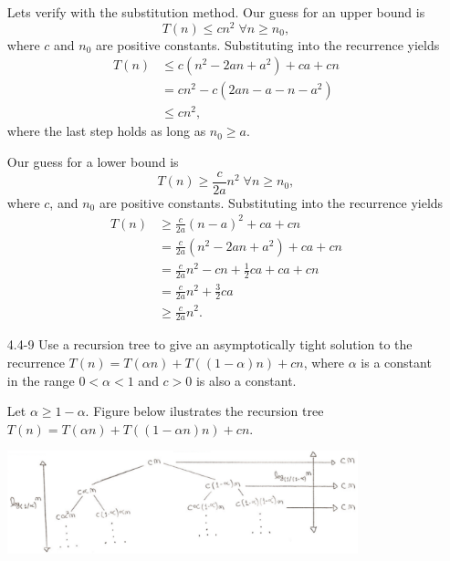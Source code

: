 \documentclass{report}
\makeatletter
\renewenvironment{framed}{%
 \def\FrameCommand##1{\hskip\@totalleftmargin
 \fboxsep=\FrameSep\fbox{##1}}%
 \MakeFramed {\advance\hsize-\width
   \@totalleftmargin\z@ \linewidth\hsize
   \@setminipage}}%
 {\par\unskip\endMakeFramed}
\DeclareMathOperator{\Forall}{\forall}
\makeatother
\begin{document}
\begin{enumerate}
\begin{framed}
Lets verify with the substitution method. Our guess for an upper bound is
\[
T(n) \le cn^2 \; \Forall n \ge n_0,
\]
where $c$ and $n_0$ are positive constants. Substituting into the
recurrence yields
\begin{equation*}
\begin{aligned}
  T(n) &\le c (n^2 - 2an + a^2) + ca + cn\\
       &=   cn^2 - c (2an - a - n - a^2)\\
       &\le cn^2,
\end{aligned}
\end{equation*}
where the last step holds as long as $n_0 \ge a$.

Our guess for a lower bound is
\[
  T(n) \ge \frac{c}{2a} n^2 \; \Forall n \ge n_0,
\]
where $c$, and $n_0$ are positive constants. Substituting into the
recurrence yields
\begin{equation*}
\begin{aligned}
  T(n) &\ge \frac{c}{2a} (n - a)^2 + ca + cn\\
       &=   \frac{c}{2a} (n^2 - 2an + a^2) + ca + cn\\
       &=   \frac{c}{2a} n^2 - cn + \frac{1}{2} ca + ca + cn\\
       &=   \frac{c}{2a} n^2 + \frac{3}{2} ca\\
       &\ge \frac{c}{2a} n^2.
\end{aligned}
\end{equation*}
\end{framed}

\newpage

\item[4.4{-}9]{Use a recursion tree to give an asymptotically tight solution to
the recurrence $T(n) = T(\alpha n) + T((1 - \alpha) n) + cn$, where $\alpha$ is
a constant in the range $0 < \alpha < 1$ and $c > 0$ is also a constant.}

\begin{framed}
Let $\alpha \ge 1 - \alpha$. Figure below ilustrates the recursion tree
$T(n) = T(\alpha n) + T((1 - \alpha n) n) + cn$.

\begin{center}
\includegraphics[width=0.8\textwidth]{images/4_4_9_1.pdf}
\end{center}


\end{framed}
\end{enumerate}
\end{document}
